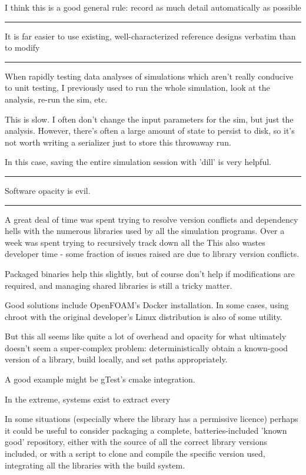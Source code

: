 \documentclass[paper.tex]{subfiles}
\begin{document}
I think this is a good general rule: record as much detail automatically as possible

\rule{\linewidth}{0.2pt}

It is far easier to use existing, well-characterized reference designs verbatim than to modify 

\rule{\linewidth}{0.2pt}

When rapidly testing data analyses of simulations which aren't really conducive to unit testing, I previously used to run the whole simulation, look at the analysis, re-run the sim, etc.

This is slow. I often don't change the input parameters for the sim, but just the analysis. However, there's often a large amount of state to persist to disk, so it's not worth writing a serializer just to store this throwaway run.

In this case, saving the entire simulation session with 'dill' is very helpful.

\rule{\linewidth}{0.2pt}

Software opacity is evil.

\rule{\linewidth}{0.2pt}

A great deal of time was spent trying to resolve version conflicts and dependency hells with the numerous libraries used by all the simulation programs. Over a week was spent trying to recursively track down all the This also wastes developer time - some fraction of issues raised are due to library version conflicts. 

Packaged binaries help this slightly, but of course don't help if modifications are required, and managing shared libraries is still a tricky matter.

Good solutions include OpenFOAM's Docker installation. In some cases, using chroot with the original developer's Linux distribution is also of some utility.

But this all seems like quite a lot of overhead and opacity for what ultimately doesn't seem a super-complex problem: deterministically obtain a known-good version of a library, build locally, and set paths appropriately.

A good example might be gTest's cmake integration.

In the extreme, systems exist to extract every 

In some situations (especially where the library has a permissive licence) perhaps it could be useful to consider packaging a complete, batteries-included 'known good' repository, either with the source of all the correct library versions included, or with a script to clone and compile the specific version used, integrating all the libraries with the build system. 
\end{document}
